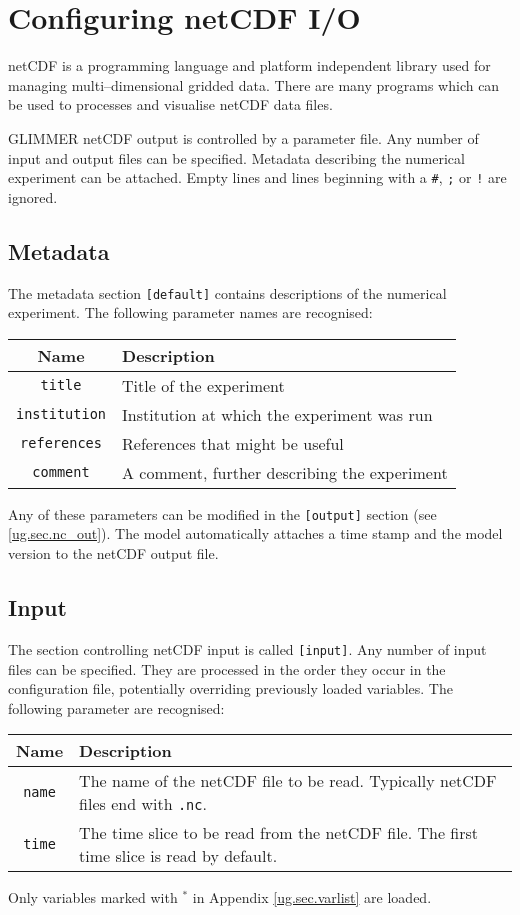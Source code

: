 \section{Configuring netCDF I/O}\label{ug.sec.ncconf}
netCDF is a programming language and platform independent library used for managing multi--dimensional gridded data. There are many programs which can be used to processes and visualise netCDF data files.

GLIMMER netCDF output is controlled by a parameter file. Any number of input and output files can be specified. Metadata describing the numerical experiment can be attached. Empty lines and lines beginning with a \texttt{\#}, \texttt{;} or \texttt{!} are ignored.

\subsection{Metadata}
The metadata section \texttt{[default]} contains descriptions of the numerical experiment. The following parameter names are recognised:
\begin{center}
\begin{tabular}{|c|p{10cm}|}
\hline
Name & Description \\
\hline
\hline
\texttt{title}& Title of the experiment\\
\hline
\texttt{institution} & Institution at which the experiment was run\\
\hline
\texttt{references} & References that might be useful\\
\hline
\texttt{comment} & A comment, further describing the experiment\\
\hline
\end{tabular}
\end{center}
Any of these parameters can be modified in the \texttt{[output]} section (see \ref{ug.sec.nc_out}). The model automatically attaches a time stamp and the model version to the netCDF output file.

\subsection{Input}
The section controlling netCDF input is called \texttt{[input]}. Any number of input files can be specified. They are processed in the order they occur in the configuration file, potentially overriding previously loaded variables. The following parameter are recognised:
\begin{center}
\begin{tabular}{|c|p{10cm}|}
\hline
Name & Description \\
\hline
\hline
\texttt{name}& The name of the netCDF file to be read. Typically netCDF files end with \texttt{.nc}.\\
\hline
\texttt{time}& The time slice to be read from the netCDF file. The first time slice is read by default.\\
\hline
\end{tabular}
\end{center}
Only variables marked with $^\ast$ in Appendix \ref{ug.sec.varlist} are loaded.


